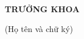 \begin{titlepage}
\begin{tabular}{c p{2cm} c}
\end{tabular}

\vspace{0.5cm}
\centerline {\textbf{TRƯỞNG KHOA}}
\centerline {\tiny (Họ tên và chữ ký)}

\end{titlepage}

\newpage